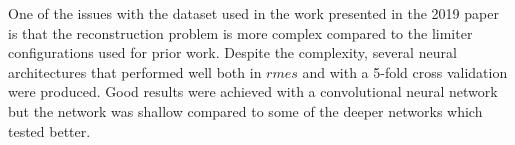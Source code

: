 One of the issues with the dataset used in the work presented in the 2019 paper is that the reconstruction problem is more complex compared to the limiter configurations used for prior work. Despite the complexity, several neural architectures that performed well both in $rmes$ and with a 5-fold cross validation were produced. Good results were achieved with a convolutional neural network but the network was shallow compared to some of the deeper networks which tested better.